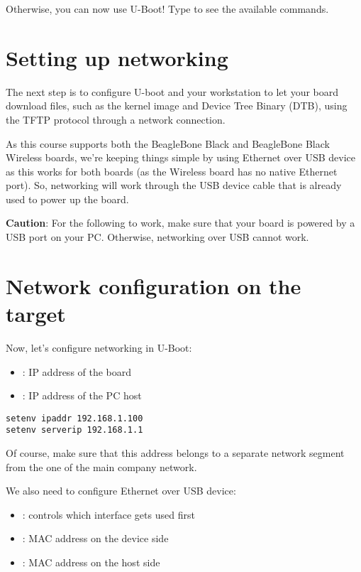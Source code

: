Otherwise, you can now use U-Boot! Type  to see the available
commands.

\section{Setting up networking}

The next step is to configure U-boot and your workstation to let your
board download files, such as the kernel image and Device Tree Binary
(DTB), using the TFTP protocol through a network connection.

As this course supports both the BeagleBone Black and BeagleBone Black
Wireless boards, we're keeping things simple by using Ethernet over USB
device as this works for both boards (as the Wireless board has no
native Ethernet port). So, networking will work through the USB device
cable that is already used to power up the board.

{\bf Caution}: For the following to work, make sure that your board
is powered by a USB port on your PC. Otherwise, networking over USB
cannot work.

\section{Network configuration on the target}
Now, let's configure networking in U-Boot:

\begin{itemize}
  \item {}: IP address of the board
  \item {}: IP address of the PC host
\end{itemize}

\begin{verbatim}
setenv ipaddr 192.168.1.100
setenv serverip 192.168.1.1
\end{verbatim}

Of course, make sure that this address belongs to a separate network
segment from the one of the main company network.

We also need to configure Ethernet over USB device:
\begin{itemize}
  \item {}: controls which interface gets used first
  \item {}: MAC address on the device side
  \item {}: MAC address on the host side  
\end{itemize}

